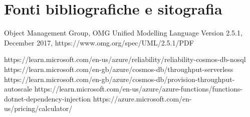 \chapter*{Fonti bibliografiche e sitografia}

Object Management Group, OMG Unified Modelling Language Version 2.5.1, December 2017, https://www.omg.org/spec/UML/2.5.1/PDF

https://learn.microsoft.com/en-us/azure/reliability/reliability-cosmos-db-nosql
https://learn.microsoft.com/en-gb/azure/cosmos-db/throughput-serverless
https://learn.microsoft.com/en-gb/azure/cosmos-db/provision-throughput-autoscale
https://learn.microsoft.com/en-us/azure/azure-functions/functions-dotnet-dependency-injection
https://azure.microsoft.com/en-us/pricing/calculator/